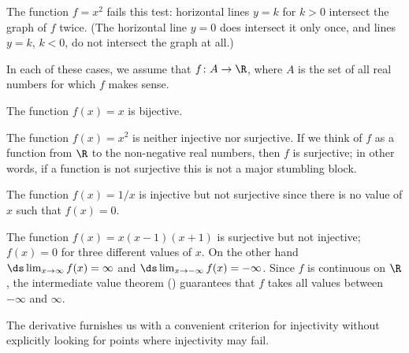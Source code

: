 \begin{example} The function $f=x^2$ fails this test: horizontal lines $y=k$
for $k>0$ intersect the graph of $f$ twice. (The horizontal line $y=0$
does intersect it only once, and lines $y=k$, $k<0$, do not intersect the
graph at all.)
\end{example}


\begin{example} In each of these cases, we assume that $f\colon A\to \R$,
where
$A$ is the set of all real numbers for which $f$ makes sense.

The function $f(x)=x $ is bijective.

The function $f(x) = x^2 $ is neither injective nor
surjective. If we think of $f$ as a function from $\R$ to the
non-negative real numbers, then $f$ is surjective; in other words, if
a function is not surjective this is not a major stumbling block. 

The function $f(x) =1/x$ is injective but not
surjective since there is no value of $x$
such that $f(x)=0$.

The function $f(x) = x(x-1)(x+1) $ is surjective but
not injective; $f(x) =0 $ for three different values of
$x$. On the other hand $\ds\lim_{x\to \infty}
f(x)=\infty$ and $\ds\lim _{x\to -\infty}
f(x)=-\infty$. Since $f$ is continuous on $\R$, the
intermediate value theorem ()
guarantees that $f$ takes all values
between $-\infty $ and $\infty$.
\end{example}


The derivative furnishes us with a convenient criterion
for injectivity without explicitly looking for points where
injectivity may fail.

